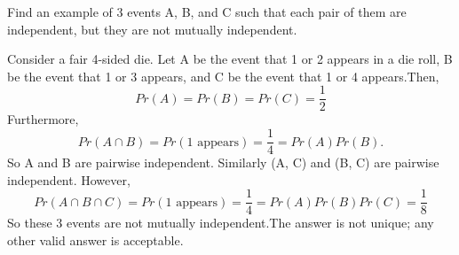 \question Find an example of 3 events A, B, and C such that each pair 
of them are independent, but they are not mutually independent.
\begin{solution}[4 cm]
Consider a fair 4-sided die. Let A be the event that 1 or 2 appears in 
a die roll, B be the event that 1 or 3 appears, and C be the event 
that 1 or 4 appears.Then, 
\[Pr(A) = Pr(B) = Pr(C) = \frac{1}{2}\] 
Furthermore, 
\[Pr(A \cap B) = Pr({1\text{ appears}}) = \frac{1}{4} = Pr(A) Pr(B).\]
So A and B are pairwise independent. Similarly (A, C) and (B, C) are 
pairwise independent. However, 
\[Pr(A \cap B \cap C) = Pr({1\text{ appears}}) = \frac{1}{4} = Pr(A) 
Pr(B) Pr(C) = \frac{1}{8}\]
So these 3 events are not mutually independent.The answer is not unique; 
any other valid answer is acceptable.
 \end{solution}
